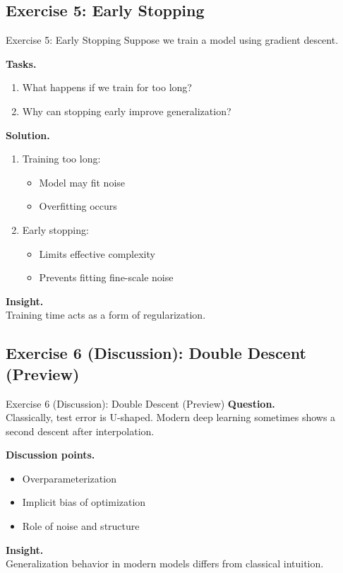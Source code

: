 \documentclass[aspectratio=169,11pt]{beamer}
\begin{document}
\subsection{Exercise 5: Early Stopping}
\begin{frame}[t,allowframebreaks]{Exercise 5: Early Stopping}
\small
Suppose we train a model using gradient descent.

\textbf{Tasks.}\\ \begin{enumerate}
    \item What happens if we train for too long?
    \item Why can stopping early improve generalization?
\end{enumerate}

\textbf{Solution.}\\ \begin{enumerate}
\item Training too long:
\begin{itemize}
    \item Model may fit noise
    \item Overfitting occurs
\end{itemize}

\item Early stopping:
\begin{itemize}
    \item Limits effective complexity
    \item Prevents fitting fine-scale noise
\end{itemize}
\end{enumerate}

\textbf{Insight.}\\ Training time acts as a form of regularization.
\end{frame}

\subsection{Exercise 6 (Discussion): Double Descent (Preview)}
\begin{frame}[t,allowframebreaks]{Exercise 6 (Discussion): Double Descent (Preview)}
\small
\textbf{Question.}\\ Classically, test error is U-shaped. Modern deep learning sometimes shows a second descent after interpolation.

\textbf{Discussion points.}\\ \begin{itemize}
    \item Overparameterization
    \item Implicit bias of optimization
    \item Role of noise and structure
\end{itemize}

\textbf{Insight.}\\ Generalization behavior in modern models differs from classical intuition.
\end{frame}
\end{document}
